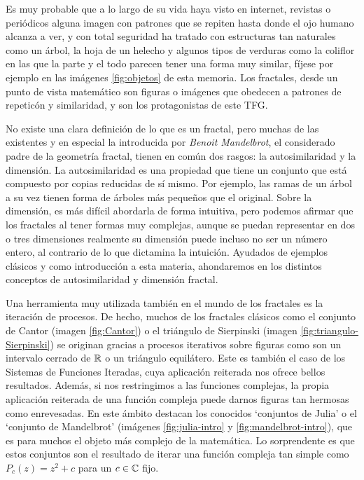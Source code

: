 
Es muy probable que a lo largo de su vida haya visto en internet, revistas o periódicos alguna imagen con patrones que se repiten hasta donde el ojo humano alcanza a ver, y con total seguridad ha tratado con estructuras tan naturales como un árbol, la hoja de un helecho y algunos tipos de verduras como la coliflor en las que la parte y el todo parecen tener una forma muy similar, fíjese por ejemplo en las imágenes \ref{fig:objetos} de esta memoria. Los fractales, desde un punto de vista matemático son figuras o imágenes que obedecen a patrones de repeticón y similaridad, y son los protagonistas de este TFG.

No existe una clara definición de lo que es un fractal, pero muchas de las existentes y en especial la introducida por \textit{Benoit Mandelbrot}, el considerado padre de la geometría fractal, tienen en común dos rasgos: la autosimilaridad y la dimensión. La autosimilaridad es una propiedad que tiene un conjunto que está compuesto por copias reducidas de sí mismo. Por ejemplo, las ramas de un árbol a su vez tienen forma de árboles más pequeños que el original. Sobre la dimensión, es más difícil abordarla de forma intuitiva, pero podemos afirmar que los fractales al tener formas muy complejas, aunque se puedan representar en dos o tres dimensiones realmente su dimensión puede incluso no ser un número entero, al contrario de lo que dictamina la intuición. Ayudados de ejemplos clásicos y como introducción a esta materia, ahondaremos en los distintos conceptos de autosimilaridad y dimensión fractal.

Una herramienta muy utilizada también en el mundo de los fractales es la iteración de procesos. De hecho, muchos de los fractales clásicos como el conjunto de Cantor (imagen \ref{fig:Cantor}) o el triángulo de Sierpinski (imagen \ref{fig:triangulo-Sierpinski}) se originan gracias a procesos iterativos sobre figuras como son un intervalo cerrado de $\mathbb{R}$ o un triángulo equilátero. Este es también el caso de los Sistemas de Funciones Iteradas, cuya aplicación reiterada nos ofrece bellos resultados. Además, si nos restringimos a las funciones complejas, la propia aplicación reiterada de una función compleja puede darnos figuras tan hermosas como enrevesadas. En este ámbito destacan los conocidos `conjuntos de Julia' o el `conjunto de Mandelbrot' (imágenes \ref{fig:julia-intro} y \ref{fig:mandelbrot-intro}), que es para muchos el objeto más complejo de la matemática. Lo sorprendente es que estos conjuntos son el resultado de iterar una función compleja tan simple como $P_c(z)=z^2+c$ para un $c\in\mathbb{C}$ fijo. 


